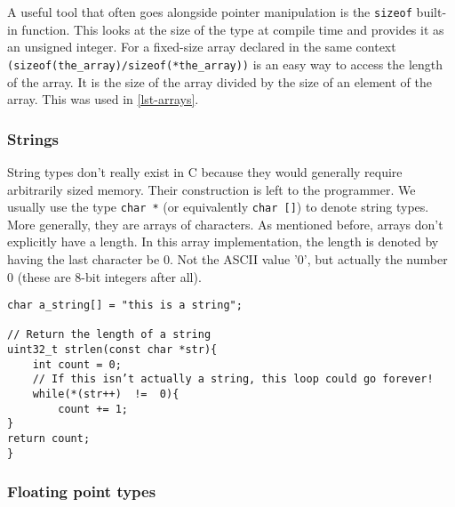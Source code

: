 \documentclass[10pt]{article}
\begin{document}
A useful tool that often goes alongside pointer manipulation is the \texttt{sizeof} built-in function. This looks at the size of the type at compile time and provides it as an unsigned integer. For a fixed-size array declared in the same context \texttt{(sizeof(the\_array)/sizeof(*the\_array))} is an easy way to access the length of the array. It is the size of the array divided by the size of an element of the array. This was used in \autoref{lst-arrays}.

\subsubsection{Strings}

String types don't really exist in C because they would generally require arbitrarily sized memory. Their construction is left to the programmer. We usually use the type \texttt{char *} (or equivalently \texttt{char []}) to denote string types. More generally, they are arrays of characters. As mentioned before, arrays don't explicitly have a length. In this array implementation, the length is denoted by having the last character be 0. Not the ASCII value '0', but actually the number 0 (these are 8-bit integers after all).

\begin{lstlisting}[label=lst-string-basics,caption=String basics]
char a_string[] = "this is a string";

// Return the length of a string
uint32_t strlen(const char *str){
	int count = 0;
	// If this isn’t actually a string, this loop could go forever!
	while(*(str++)  !=  0){
		count += 1;
}
return count;
}
\end{lstlisting}


\subsubsection{Floating point types}
\end{document}
